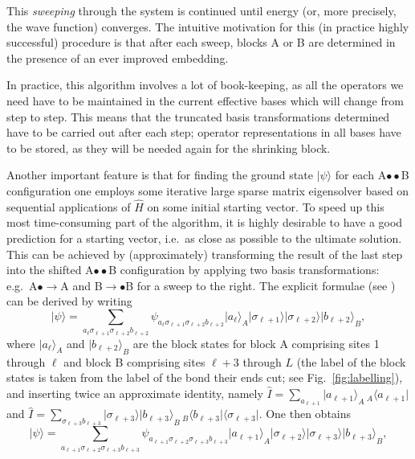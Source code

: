 \documentclass[a4paper,10pt,oneside,onecolumn,1p,times]{elsarticle}
\newcommand{\bra}[1]{\mbox{$\langle #1  |$}}
\newcommand{\ket}[1]{\mbox{$| #1  \rangle$}}
\begin{document}
This {\em sweeping} through the system is continued until energy (or, more precisely, the wave function) converges. The intuitive motivation for this (in practice highly successful) procedure is that after each sweep, blocks A or B are determined in the presence of an ever improved embedding.

In practice, this algorithm involves a lot of book-keeping, as all the operators we need have to be maintained in the current effective bases which will change from step to step. This means that the truncated basis transformations determined have to be carried out after each step; operator representations in all bases have to be stored, as they will be needed again for the shrinking block. 

Another important feature is that for finding the ground state $\ket{\psi}$ for each A$\bullet\bullet$B configuration one employs some iterative large sparse matrix eigensolver based on sequential applications of $\hat{H}$ on some initial starting vector. To speed up this most time-consuming part of the algorithm, it is highly desirable to have a good prediction for a starting vector, i.e.\ as close as possible to the ultimate solution. This can be achieved by (approximately) transforming the result of the last step into the shifted  A$\bullet\bullet$B configuration \cite{White96} by applying two basis transformations: e.g.\ A$\bullet\rightarrow$A and B$\rightarrow\bullet$B for a sweep to the right. The explicit formulae (see \cite{Schollwoeck05,White96}) can be derived by writing
\begin{equation}
\ket{\psi} = \sum_{a_\ell\sigma_{\ell+1}\sigma_{\ell+2}b_{\ell+2}} \psi_{a_\ell\sigma_{\ell+1}\sigma_{\ell+2}b_{\ell+2}} \ket{a_\ell}_A \ket{\sigma_{\ell+1}} \ket{\sigma_{\ell+2}} \ket{b_{\ell+2}}_B,
\end{equation}
where $\ket{a_\ell}_A$ and $\ket{b_{\ell+2}}_B$ are the block states for block A comprising sites 1 through $\ell$ and block B comprising sites $\ell+3$ through $L$ (the label of the block states is taken from the label of the bond their ends cut; see Fig.~\ref{fig:labelling}), and inserting twice an approximate identity, namely $\hat{I} = \sum_{a_{\ell+1}} \ket{a_{\ell+1}}_A {\,}_A\bra{a_{\ell+1}}$ and
$\hat{I} = \sum_{\sigma_{\ell+3} b_{\ell+3}} \ket{\sigma_{\ell+3}}\ket{b_{\ell+3}}_B {\, }_B \bra{b_{\ell+3}} \bra{\sigma_{\ell+3}}$.
One then obtains
\begin{equation}
\ket{\psi} = \sum_{a_{\ell+1}\sigma_{\ell+2}\sigma_{\ell+3}b_{\ell+3}} \psi_{a_{\ell+1}\sigma_{\ell+2}\sigma_{\ell+3}b_{\ell+3}} \ket{a_{\ell+1}}_A \ket{\sigma_{\ell+2}} \ket{\sigma_{\ell+3}} \ket{b_{\ell+3}}_B,
\end{equation}
\end{document}
